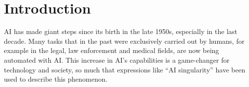 \documentclass[conference]{IEEEtran}
\newcommand{\cit}[1][]{\todo[tickmarkheight=0.2cm]{cit #1}}
\begin{document}
\begin{abstract}
\end{abstract}





\section{Introduction}
\label{sec:intro}

AI has made giant steps since its birth in the late 1950s, especially in the last
decade. Many tasks that in the past were exclusively carried out by humans, for
example in the legal, law enforcement and medical fields, are now being
automated with AI.  \cit This increase in AI's capabilities is a game-changer for
technology and society, so much that expressions like ``AI singularity'' \cit
have been used to describe this
phenomenon.
\end{document}
